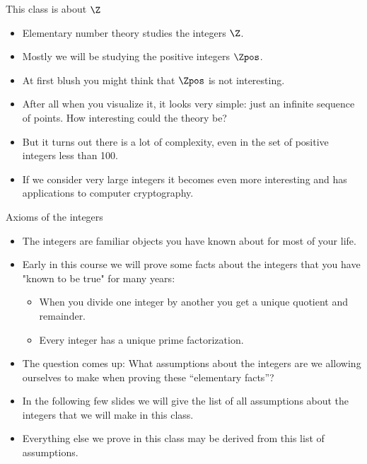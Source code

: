 \documentclass[handout]{beamer}
\begin{document}
\begin{frame}{This class is about $\Z$}

\begin{itemize}
\item Elementary number theory studies the integers $\Z$.
\item Mostly we will be studying the positive integers $\Zpos$.
\item At first blush you might think that $\Zpos$ is not interesting.
\item After all when you visualize it, it looks very simple: just an infinite sequence of points.
How interesting could the theory be?
\item But it turns out there is a lot of complexity, even in the set of positive integers less than 100.
\item If we consider very large integers it becomes even more interesting and has applications
to computer cryptography.
\end{itemize}
\end{frame}

\begin{frame}{Axioms of the integers}

\begin{itemize}
  \item The integers are familiar objects you have known about for most of your life.
  \item Early in this course we will prove some facts about the integers
  that you have "known to be true" for many years:
  \begin{itemize}
    \item When you divide one integer by another you get a unique quotient and remainder.
    \item Every integer has a unique prime factorization.
  \end{itemize}
  \item The question comes up: What assumptions about the integers are we allowing
  ourselves to make when proving these ``elementary facts''?
  \item In the following few slides we will give the list of all assumptions
  about the integers that we will make in this class.
  \item Everything else we prove in this class may be derived from this list of assumptions.
\end{itemize}
\end{frame}
\end{document}
